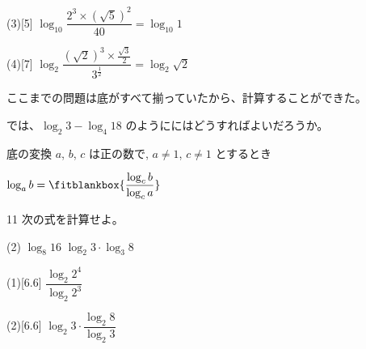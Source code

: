 \documentclass[14pt,dvipdfmx]{jsarticle}
\begin{document}
\begin{answerbox}{(3)}[5]
  $\log_{10} \dfrac{2^{3} \times (\sqrt{5})^{2}}{40}=\log_{10} 1$
\end{answerbox}
\begin{answerbox}{(4)}[7]
  $\log_{2} \dfrac{(\sqrt{2})^{3} \times \frac{\sqrt{3}}{2}}{3^{\frac{1}{2}}}=\log_{2} \sqrt{2}$\par\vspace{0.45em}
\end{answerbox}

\vfill
\nextpage

\vspace{-2.0zw}%
\vspace{-0.15em}
ここまでの問題は底がすべて揃っていたから、計算することができた。

では、$\log_{2} 3 - \log_{4} 18$ のようににはどうすればよいだろうか。
\par\vspace{0.05em}

\begin{theorembox}{底の変換}
  $a$, $b$, $c$ は正の数で, $a \neq 1$, $c \neq 1$ とするとき
  \par\vspace{0.15em}
  {\centering
  $\log_{a} b = \fitblankbox{\dfrac{\log_{c} b}{\log_{c} a}}$
  \par}
\end{theorembox}
\par\vspace{-0.5em}

\begin{exampleprob}{11}
  次の式を計算せよ。
  \par\vspace{-0.35em}
  \begin{tasks}[label=(\arabic*), label-width=1.6zw, item-indent=2zw, after-item-skip=0.04em](2)
    \task $\log_{8} 16$
    \task $\log_{2} 3 \cdot \log_{3} 8$
  \end{tasks}
\end{exampleprob}

\noindent
\begin{minipage}[t]{0.49\linewidth}
\begin{answerbox}{(1)}[6.6]
  $\dfrac{\log_{2} 2^{4}}{\log_{2} 2^{3}}$\par\vspace{0.55em}
\end{answerbox}
\end{minipage}\hfill
\begin{minipage}[t]{0.49\linewidth}
\begin{answerbox}{(2)}[6.6]
  $\log_{2} 3 \cdot \dfrac{\log_{2} 8}{\log_{2} 3}$
  \par\vspace{1.5em}
\end{answerbox}
\end{minipage}
\end{document}
